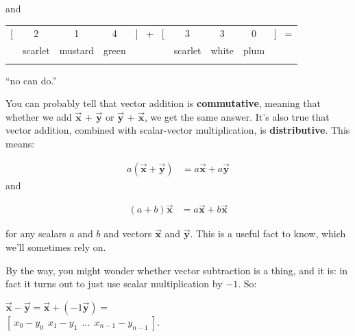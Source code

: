 and


\begin{center}
\begin{tabular}{ccccccccc}
[ & 2 & 1 & 4 & ] \ + \ [ & 3 & 3 & 0 & ] \ = \\
& \scriptsize{scarlet} & \scriptsize{mustard} & \scriptsize{green} & &
\scriptsize{scarlet} & \scriptsize{white} & \scriptsize{plum} & \\
\normalsize
\end{tabular}

\vspace{-.15in}
``no can do.''
\end{center}
\vspace{-.15in}


\medskip
You can probably tell that vector addition is \textbf{commutative}, meaning
that whether we add $\overrightarrow{\textbf{x}}$ +
$\overrightarrow{\textbf{y}}$ or $\overrightarrow{\textbf{y}}$ +
$\overrightarrow{\textbf{x}}$, we get the same answer. It's also true that
vector addition, combined with scalar-vector multiplication, is
\textbf{distributive}. This means:

\vspace{-.15in}
\begin{align*}
a (\overrightarrow{\textbf{x}} + \overrightarrow{\textbf{y}}) &=
a \overrightarrow{\textbf{x}} + a \overrightarrow{\textbf{y}}
\end{align*}
\vspace{-.15in}
and

\vspace{-.15in}
\begin{align*}
(a + b) \overrightarrow{\textbf{x}} &=
a \overrightarrow{\textbf{x}} + b \overrightarrow{\textbf{x}}
\end{align*}
\vspace{-.15in}

for any scalars $a$ and $b$ and vectors $\overrightarrow{\textbf{x}}$ and
$\overrightarrow{\textbf{y}}$. This is a useful fact to know, which we'll
sometimes rely on.

\medskip

By the way, you might wonder whether vector subtraction is a thing, and it is:
in fact it turns out to just use scalar multiplication by $-1$. So:

\vspace{-.15in}
\begin{center}
$\overrightarrow{\textbf{x}} - \overrightarrow{\textbf{y}} =
\overrightarrow{\textbf{x}} + (-1 \overrightarrow{\textbf{y}}) =$ \\
$ [\ x_0 - y_0\ \ x_1 - y_1\ \ \dots \ \ x_{n-1} - y_{n-1}\ ]$.
\end{center}

